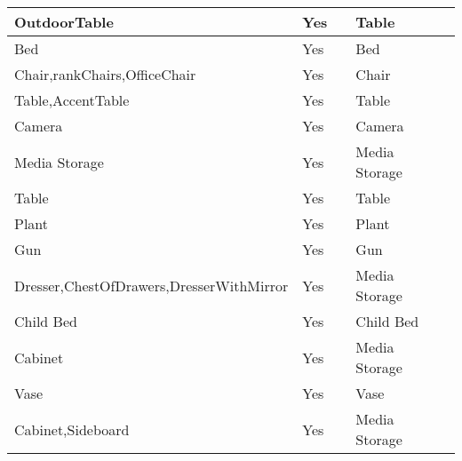 \documentclass{article}
\begin{document}
\begin{longtable}{|l|l|l|l|l|}
OutdoorTable                             & Yes              &                                & Table          &                             \\ \hline
Bed                                      & Yes              &                                & Bed            &                             \\ \hline
Chair,rankChairs,OfficeChair             & Yes              &                                & Chair          &                             \\ \hline
Table,AccentTable                        & Yes              &                                & Table          &                             \\ \hline
Camera                                   & Yes              &                                & Camera         &                             \\ \hline
Media Storage                            & Yes              &                                & Media Storage  &                             \\ \hline
Table                                    & Yes              &                                & Table          &                             \\ \hline
Plant                                    & Yes              &                                & Plant          &                             \\ \hline
Gun                                      & Yes              &                                & Gun            &                             \\ \hline
Dresser,ChestOfDrawers,DresserWithMirror & Yes              &                                & Media Storage  &                             \\ \hline
Child Bed                                & Yes              &                                & Child Bed      &                             \\ \hline
Cabinet                                  & Yes              &                                & Media Storage  &                             \\ \hline
Vase                                     & Yes              &                                & Vase           &                             \\ \hline
Cabinet,Sideboard                        & Yes              &                                & Media Storage  &                             \\ \hline

\end{longtable}
\end{document}
